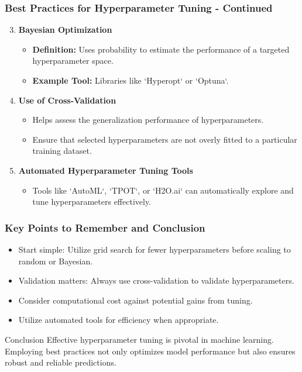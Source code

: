 \documentclass[aspectratio=169]{beamer}
\begin{document}
\begin{frame}
    \frametitle{Best Practices for Hyperparameter Tuning - Continued}
    \begin{enumerate}
        \setcounter{enumi}{2} %
        \item \textbf{Bayesian Optimization}
        \begin{itemize}
            \item \textbf{Definition:} Uses probability to estimate the performance of a targeted hyperparameter space.
            \item \textbf{Example Tool:} Libraries like `Hyperopt` or `Optuna`.
        \end{itemize}
        
        \item \textbf{Use of Cross-Validation}
        \begin{itemize}
            \item Helps assess the generalization performance of hyperparameters.
            \item Ensure that selected hyperparameters are not overly fitted to a particular training dataset.
        \end{itemize}
        
        \item \textbf{Automated Hyperparameter Tuning Tools}
        \begin{itemize}
            \item Tools like `AutoML`, `TPOT`, or `H2O.ai` can automatically explore and tune hyperparameters effectively.
        \end{itemize}
    \end{enumerate}
\end{frame}

\begin{frame}
    \frametitle{Key Points to Remember and Conclusion}
    \begin{itemize}
        \item Start simple: Utilize grid search for fewer hyperparameters before scaling to random or Bayesian.
        \item Validation matters: Always use cross-validation to validate hyperparameters.
        \item Consider computational cost against potential gains from tuning.
        \item Utilize automated tools for efficiency when appropriate.
    \end{itemize}
    
    \begin{block}{Conclusion}
    Effective hyperparameter tuning is pivotal in machine learning. Employing best practices not only optimizes model performance but also ensures robust and reliable predictions.
    \end{block}
\end{frame}
\end{document}
